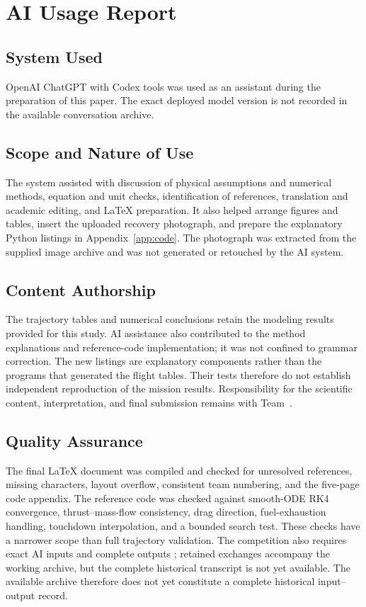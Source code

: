 \section{AI Usage Report}
\label{sec:ai}
\subsection{System Used}
OpenAI ChatGPT with Codex tools was used as an assistant during the preparation of this paper. The exact deployed model version is not recorded in the available conversation archive.

\subsection{Scope and Nature of Use}
The system assisted with discussion of physical assumptions and numerical methods, equation and unit checks, identification of references, translation and academic editing, and LaTeX preparation. It also helped arrange figures and tables, insert the uploaded recovery photograph, and prepare the explanatory Python listings in Appendix~\ref{app:code}. The photograph was extracted from the supplied image archive and was not generated or retouched by the AI system.

\subsection{Content Authorship}
The trajectory tables and numerical conclusions retain the modeling results provided for this study. AI assistance also contributed to the method explanations and reference-code implementation; it was not confined to grammar correction. The new listings are explanatory components rather than the programs that generated the flight tables. Their tests therefore do not establish independent reproduction of the mission results. Responsibility for the scientific content, interpretation, and final submission remains with Team~\TeamNumber.

\subsection{Quality Assurance}
The final LaTeX document was compiled and checked for unresolved references, missing characters, layout overflow, consistent team numbering, and the five-page code appendix. The reference code was checked against smooth-ODE RK4 convergence, thrust--mass-flow consistency, drag direction, fuel-exhaustion handling, touchdown interpolation, and a bounded search test. These checks have a narrower scope than full trajectory validation. The competition also requires exact AI inputs and complete outputs \cite{airules}; retained exchanges accompany the working archive, but the complete historical transcript is not yet available. The available archive therefore does not yet constitute a complete historical input--output record.
